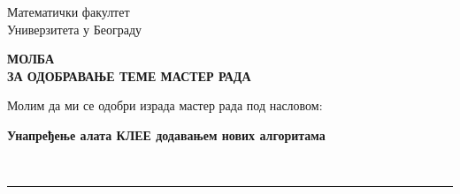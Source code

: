\documentclass[a4paper]{article}
\begin{document}
\thispagestyle{empty}

\begin{flushleft}
Математички факултет\\
Универзитета у Београду
\end{flushleft}

\bigskip

\begin{center}
\textbf{МОЛБА\\
ЗА ОДОБРАВАЊЕ ТЕМЕ МАСТЕР РАДА
}\end{center}

\bigskip

\begin{flushleft}
Молим да ми се одобри израда мастер рада под насловом:
\end{flushleft}

\begin{minipage}{16.5cm}
\textbf{Унапређење алата КЛЕЕ додавањем нових алгоритама}
\end{minipage}\\
\rule[4mm]{17.5cm}{.05mm}
\end{document}
